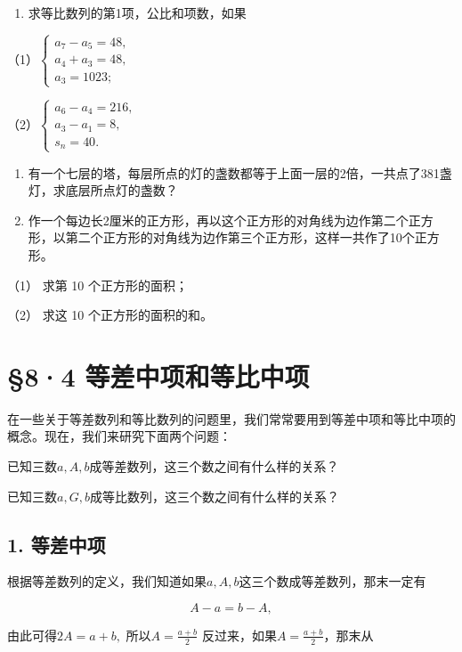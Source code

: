 \begin{enumerate}[start=3]
\item
  求等比数列的第1项，公比和项数，如果
\end{enumerate}

（1）\(\left\{ \begin{array}{l} a_{7} - a_{5} = 48, \\ a_{4} + a_{3} = 48, \\ a_{3} = 1023; \end{array} \right.\)

（2）\(\left\{ \begin{array}{l} a_{6} - a_{4} = 216, \\ a_{3} - a_{1} = 8, \\ s_{n} = 40. \end{array} \right.\)

\begin{enumerate}[start=4]
\item
  有一个七层的塔，每层所点的灯的盏数都等于上面一层的2倍，一共点了381盏灯，求底层所点灯的盏数？
\item
  作一个每边长2厘米的正方形，再以这个正方形的对角线为边作第二个正方形，以第二个正方形的对角线为边作第三个正方形，这样一共作了10个正方形。
\end{enumerate}

（1） 求第 10 个正方形的面积；

（2） 求这 10 个正方形的面积的和。

\section{§8·4 等差中项和等比中项}

在一些关于等差数列和等比数列的问题里，我们常常要用到等差中项和等比中项的概念。现在，我们来研究下面两个问题：

已知三数\(a, A, b\)成等差数列，这三个数之间有什么样的关系？

已知三数\(a, G, b\)成等比数列，这三个数之间有什么样的关系？

\subsection{1. 等差中项}

根据等差数列的定义，我们知道如果\(a, A, b\)这三个数成等差数列，那末一定有

\[
A - a = b - A,
\]

由此可得\(2A = a + b,\) 所以\(A = \frac{a + b}{2}\)
反过来，如果\(A = \frac{a + b}{2}\)，那末从

